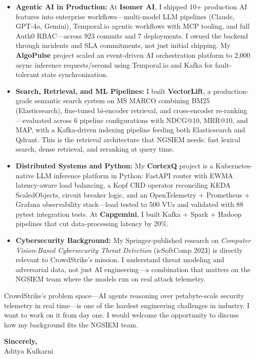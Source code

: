 \documentclass[11pt,letterpaper]{article}
\begin{document}
\begin{itemize}[leftmargin=*, itemsep=3pt, label={\color{CrowdStrikeRed}\faAngleRight}]
    \item \textbf{Agentic AI in Production:} At \textbf{Isomer AI}, I shipped 10+ production AI features into enterprise workflows---multi-model LLM pipelines (Claude, GPT-4o, Gemini), Temporal.io agentic workflows with MCP tooling, and full Auth0 RBAC---across 923 commits and 7 deployments. I owned the backend through incidents and SLA commitments, not just initial shipping. My \textbf{AlgoPulse} project scaled an event-driven AI orchestration platform to 2,000 async inference requests/second using Temporal.io and Kafka for fault-tolerant state synchronization.

    \item \textbf{Search, Retrieval, and ML Pipelines:} I built \textbf{VectorLift}, a production-grade semantic search system on MS MARCO combining BM25 (Elasticsearch), fine-tuned bi-encoder retrieval, and cross-encoder re-ranking---evaluated across 6 pipeline configurations with NDCG@10, MRR@10, and MAP, with a Kafka-driven indexing pipeline feeding both Elasticsearch and Qdrant. This is the retrieval architecture that NGSIEM needs: fast lexical search, dense retrieval, and reranking at query time.

    \item \textbf{Distributed Systems and Python:} My \textbf{CortexQ} project is a Kubernetes-native LLM inference platform in Python: FastAPI router with EWMA latency-aware load balancing, a Kopf CRD operator reconciling KEDA ScaledObjects, circuit breaker logic, and an OpenTelemetry + Prometheus + Grafana observability stack---load tested to 500 VUs and validated with 88 pytest integration tests. At \textbf{Capgemini}, I built Kafka + Spark + Hadoop pipelines that cut data-processing latency by 20\%.

    \item \textbf{Cybersecurity Background:} My Springer-published research on \textit{Computer Vision-Based Cybersecurity Threat Detection} (icSoftComp 2023) is directly relevant to CrowdStrike's mission. I understand threat modeling and adversarial data, not just AI engineering---a combination that matters on the NGSIEM team where the models run on real attack telemetry.
\end{itemize}

\vspace{6pt}

CrowdStrike's problem space---AI agents reasoning over petabyte-scale security telemetry in real time---is one of the hardest engineering challenges in industry. I want to work on it from day one. I would welcome the opportunity to discuss how my background fits the NGSIEM team.

\vspace{12pt}

\textbf{Sincerely,}\\[8pt]
Aditya Kulkarni
\end{document}
